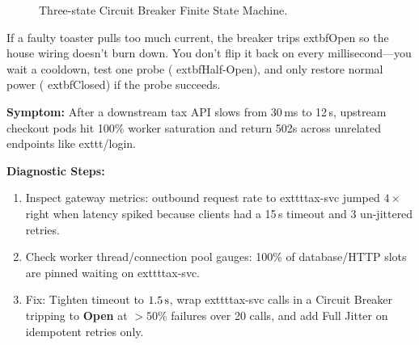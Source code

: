 \begin{figure}[htbp]
\centering
{}
\caption{Three-state Circuit Breaker Finite State Machine.}
\label{fig:v1-ch07-circuit-breaker}
\end{figure}

\begin{intuitionbox}
If a faulty toaster pulls too much current, the breaker trips 	extbf{Open} so the house wiring doesn't burn down. You don't flip it back on every millisecond---you wait a cooldown, test one probe (	extbf{Half-Open}), and only restore normal power (	extbf{Closed}) if the probe succeeds.
\end{intuitionbox}

\begin{realworldbox}
\textbf{Symptom:} After a downstream tax API slows from 30\,ms to 12\,s, upstream checkout pods hit 100\% worker saturation and return 502s across unrelated endpoints like 	exttt{/login}.

\textbf{Diagnostic Steps:}
\begin{enumerate}[leftmargin=15pt,itemsep=2pt]
  \item Inspect gateway metrics: outbound request rate to 	exttt{tax-svc} jumped $4\times$ right when latency spiked because clients had a 15\,s timeout and 3 un-jittered retries.
  \item Check worker thread/connection pool gauges: 100\% of database/HTTP slots are pinned waiting on 	exttt{tax-svc}.
  \item Fix: Tighten timeout to $1.5\text{\,s}$, wrap 	exttt{tax-svc} calls in a Circuit Breaker tripping to \textbf{Open} at $>50\%$ failures over 20 calls, and add Full Jitter on idempotent retries only.
\end{enumerate}
\end{realworldbox}

